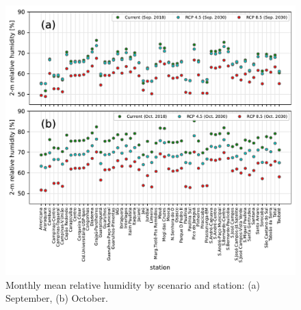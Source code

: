  \begin{figure}[!ht]
  \includegraphics[width=1\textwidth]{fig/rh_sep_oct.pdf}
  \caption{Monthly mean relative humidity by scenario and station: (a) September, (b) October.}
  \label{fig:rh_scen}
\end{figure}

